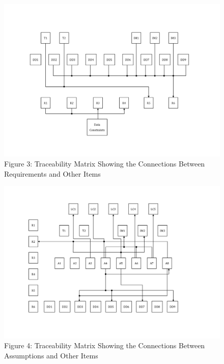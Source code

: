\documentclass[12pt]{article}
\begin{document}
\begin{figure}
\begin{center}
\includegraphics[width=\textwidth]{../../../datafiles/GlassBR/RTrace.png}
\caption{Figure 3: Traceability Matrix Showing the Connections Between Requirements and Other Items}
\label{Figure:Figu3:TracMatrShowtheConnBetwRequandOtheItem}
\end{center}
\end{figure}
\begin{figure}
\begin{center}
\includegraphics[width=\textwidth]{../../../datafiles/GlassBR/ATrace.png}
\caption{Figure 4: Traceability Matrix Showing the Connections Between Assumptions and Other Items}
\label{Figure:Figu4:TracMatrShowtheConnBetwAssuandOtheItem}
\end{center}
\end{figure}
\end{document}
